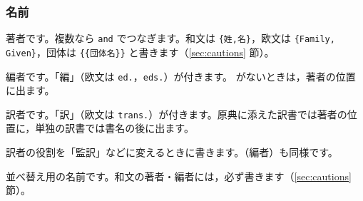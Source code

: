 \subsubsection{名前}
\begin{fieldlist}

著者です。複数なら \texttt{and} でつなぎます。和文は \texttt{\{姓,名\}}，欧文は \texttt{\{Family, Given\}}，団体は \texttt{\{\{団体名\}\}} と書きます（\ref{sec:cautions} 節）。


編者です。「編」（欧文は \texttt{ed.}，\texttt{eds.}）が付きます。 がないときは，著者の位置に出ます。


訳者です。「訳」（欧文は \texttt{trans.}）が付きます。原典に添えた訳書では著者の位置に，単独の訳書では書名の後に出ます。


訳者の役割を「監訳」などに変えるときに書きます。（編者）も同様です。


並べ替え用の名前です。和文の著者・編者には，必ず書きます（\ref{sec:cautions} 節）。
\end{fieldlist}

